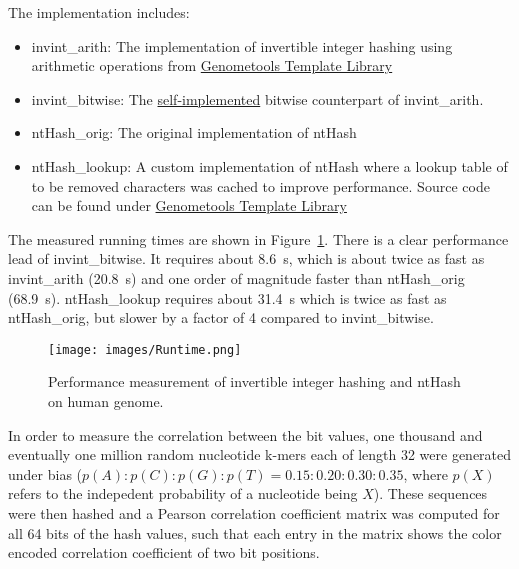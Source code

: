 \documentclass[11pt,a4paper]{scrartcl}
\begin{document}
The implementation includes:
\begin{itemize}
    \item \textsf{invint\_arith}: The implementation of invertible integer hashing using arithmetic operations from \href{https://github.com/stefan-kurtz/gttl}{\textsf{Genometools Template Library}}
    \item \textsf{invint\_bitwise}: The \href{https://gitlab.rrz.uni-hamburg.de/BAR3085/cis-seminar-rekursives-hashing}{self-implemented} bitwise counterpart of \textsf{invint\_arith}.
    \item \textsf{ntHash\_orig}: The original implementation of ntHash~\cite{MOH:CHU:VAN:BIR:2016}
    \item \textsf{ntHash\_lookup}: A custom implementation of ntHash where a lookup table of to be removed characters was cached to improve performance. Source code can be found under \href{https://github.com/stefan-kurtz/gttl}{\textsf{Genometools Template Library}}
\end{itemize}
The measured running times are shown in Figure~\ref{fig:runtime}.
There is a clear performance lead of \textsf{invint\_bitwise}.
It requires about 8.6~s, which is about twice as fast as \textsf{invint\_arith}
(20.8~s) and one order of magnitude faster than \textsf{ntHash\_orig} (68.9~s).
\textsf{ntHash\_lookup} requires about 31.4~s which
is twice as fast as \textsf{ntHash\_orig}, but slower by a factor of 4 compared
to \textsf{invint\_bitwise}.
\begin{figure}[t]
\begin{center}
\texttt{[image: images/Runtime.png]}
\end{center}
\caption{Performance measurement of invertible integer hashing and ntHash
on human genome.}
\label{fig:runtime}
\end{figure}

In order to measure the correlation between the bit values, one thousand
and eventually one million random nucleotide k-mers each of length 32
were generated under  bias ($p(A):p(C):p(G):p(T)=0.15:0.20:0.30:0.35$, where $p(X)$ refers to the indepedent probability of a nucleotide being $X$). These sequences were then
hashed and a Pearson correlation coefficient matrix was computed for all 64
bits of the hash values, such that each entry in the matrix shows the
color encoded correlation coefficient of two bit positions.
\end{document}

